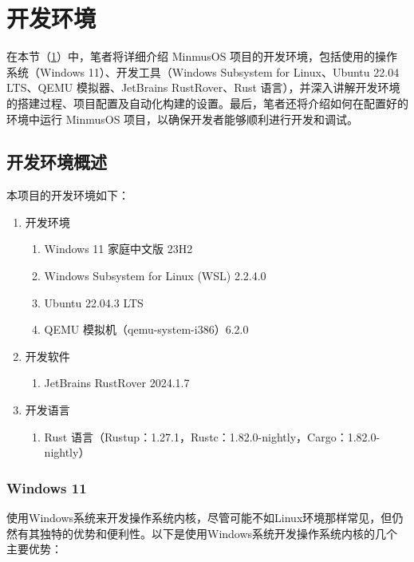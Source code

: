 \section{开发环境}\label{sec:DevelopmentEnvironment}

在本节（\cref{sec:DevelopmentEnvironment}）中，笔者将详细介绍 MinmusOS 项目的开发环境，包括使用的操作系统（Windows 11）、开发工具（Windows Subsystem for Linux、Ubuntu 22.04 LTS、QEMU 模拟器、JetBrains RustRover、Rust 语言），并深入讲解开发环境的搭建过程、项目配置及自动化构建的设置。最后，笔者还将介绍如何在配置好的环境中运行 MinmusOS 项目，以确保开发者能够顺利进行开发和调试。

\subsection{开发环境概述}

本项目的开发环境如下：

\begin{enumerate}
    \item 开发环境
          \begin{enumerate}
              \item Windows 11 家庭中文版 23H2
              \item Windows Subsystem for Linux (WSL) 2.2.4.0
              \item Ubuntu 22.04.3 LTS
              \item QEMU 模拟机（qemu-system-i386）6.2.0
          \end{enumerate}
    \item 开发软件
          \begin{enumerate}
              \item JetBrains RustRover 2024.1.7
          \end{enumerate}
    \item 开发语言
          \begin{enumerate}
              \item Rust 语言（Rustup：1.27.1，Rustc：1.82.0-nightly，Cargo：1.82.0-nightly）
          \end{enumerate}
\end{enumerate}

\subsubsection{Windows 11}

使用Windows系统来开发操作系统内核，尽管可能不如Linux环境那样常见，但仍然有其独特的优势和便利性。以下是使用Windows系统开发操作系统内核的几个主要优势：

